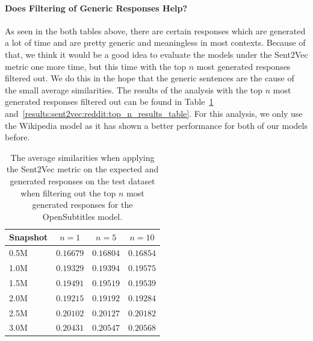 \paragraph{Does Filtering of Generic Responses Help?} As seen in the both tables above, there are certain responses which are generated a lot of time and are pretty generic and meaningless in most contexts. Because of that, we think it would be a good idea to evaluate the models under the Sent2Vec metric one more time, but this time with the top $n$ most generated responses filtered out. We do this in the hope that the generic sentences are the cause of the small average similarities. The results of the analysis with the top $n$ most generated responses filtered out can be found in Table~\ref{results:sent2vec:opensubtitles:top_n_results_table} and~\ref{results:sent2vec:reddit:top_n_results_table}. For this analysis, we only use the Wikipedia model as it has shown a better performance for both of our models before.
\\
\begin{table}[H]
	\centering
	\begin{adjustbox}{max width=\textwidth}
		\begin{tabular}{lccc}
			\toprule
			Snapshot & $n = 1$ & $n = 5$ & $n = 10$\\
			\midrule
			0.5M & $0.16679$ & $0.16804$ & $0.16854$\\
			1.0M & $0.19329$ & $0.19394$ & $0.19575$\\
			1.5M & $0.19491$ & $0.19519$ & $0.19539$\\
			2.0M & $0.19215$ & $0.19192$ & $0.19284$\\
			2.5M & $0.20102$ & $0.20127$ & $0.20182$\\
			3.0M & $0.20431$ & $0.20547$ & $0.20568$\\
			\bottomrule
		\end{tabular}
	\end{adjustbox}
	\caption{The average similarities when applying the Sent2Vec metric on the expected and generated responses on the test dataset when filtering out the top $n$ most generated responses for the OpenSubtitles model.}
	\label{results:sent2vec:opensubtitles:top_n_results_table}
\end{table}

